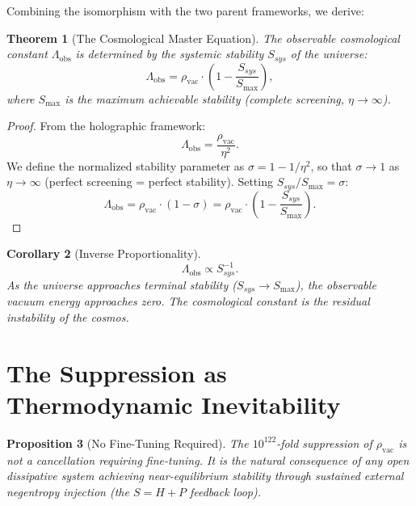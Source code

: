 \documentclass[12pt, a4paper]{article}
\theoremstyle{plain}
\newtheorem{theorem}{Theorem}[section]
\newtheorem{proposition}[theorem]{Proposition}
\newtheorem{corollary}[theorem]{Corollary}
\theoremstyle{definition}
\theoremstyle{remark}
\begin{document}
Combining the isomorphism with the two parent frameworks, we derive:

\begin{theorem}[The Cosmological Master Equation]\label{thm:cosmo_master}
The observable cosmological constant $\Lambda_{\text{obs}}$ is determined by the systemic stability $S_{sys}$ of the universe:
\begin{equation}\label{eq:cosmo_master}
    \Lambda_{\text{obs}} = \rho_{\text{vac}} \cdot \left(1 - \frac{S_{sys}}{S_{\max}}\right),
\end{equation}
where $S_{\max}$ is the maximum achievable stability (complete screening, $\eta \to \infty$).
\end{theorem}

\begin{proof}
From the holographic framework:
\begin{equation}
    \Lambda_{\text{obs}} = \frac{\rho_{\text{vac}}}{\eta^2}.
\end{equation}
We define the normalized stability parameter as $\sigma = 1 - 1/\eta^2$, so that $\sigma \to 1$ as $\eta \to \infty$ (perfect screening = perfect stability). Setting $S_{sys}/S_{\max} = \sigma$:
\begin{equation}
    \Lambda_{\text{obs}} = \rho_{\text{vac}} \cdot (1 - \sigma) = \rho_{\text{vac}} \cdot \left(1 - \frac{S_{sys}}{S_{\max}}\right).
\end{equation}
\end{proof}

\begin{corollary}[Inverse Proportionality]
\begin{equation}\label{eq:inverse}
    \Lambda_{\text{obs}} \propto S_{sys}^{-1}.
\end{equation}
As the universe approaches terminal stability ($S_{sys} \to S_{\max}$), the observable vacuum energy approaches zero. The cosmological constant is the \emph{residual instability} of the cosmos.
\end{corollary}

\section{The Suppression as Thermodynamic Inevitability}\label{sec:inevitability}

\begin{proposition}[No Fine-Tuning Required]
The $10^{122}$-fold suppression of $\rho_{\text{vac}}$ is not a cancellation requiring fine-tuning. It is the natural consequence of any open dissipative system achieving near-equilibrium stability through sustained external negentropy injection (the $S = H + P$ feedback loop).
\end{proposition}
\end{document}
